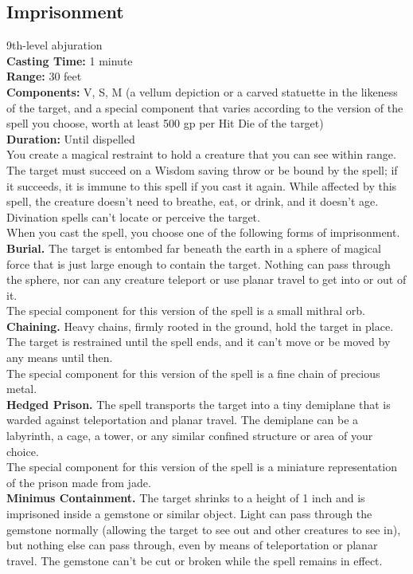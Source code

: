 \documentclass[11pt, A4paper, english]{article}
\begin{document}
		\subsection{Imprisonment}
9th-level abjuration \\
\textbf{Casting Time:} 1 minute \\
\textbf{Range:} 30 feet \\
\textbf{Components:} V, S, M (a vellum depiction or a carved statuette in the likeness of the target, and a special component that varies according to the version of the spell you choose, worth at least 500 gp per Hit Die of the target) \\
\textbf{Duration:} Until dispelled \\
You create a magical restraint to hold a creature that you can see within range. The target must succeed on a Wisdom saving throw or be bound by the spell; if it succeeds, it is immune to this spell if you cast it again. While affected by this spell, the creature doesn't need to breathe, eat, or drink, and it doesn’t age. Divination spells can’t locate or perceive the target. \\
When you cast the spell, you choose one of the following forms of imprisonment. \\
\textbf{Burial.} The target is entombed far beneath the earth in a sphere of magical force that is just large enough to contain the target. Nothing can pass through the sphere, nor can any creature teleport or use planar travel to get into or out of it. \\
The special component for this version of the spell is a small mithral orb. \\
\textbf{Chaining.} Heavy chains, firmly rooted in the ground, hold the target in place. The target is restrained until the spell ends, and it can’t move or be moved by any means until then. \\
The special component for this version of the spell is a fine chain of precious metal. \\
\textbf{Hedged Prison.} The spell transports the target into a tiny demiplane that is warded against teleportation and planar travel. The demiplane can be a labyrinth, a cage, a tower, or any similar confined structure or area of your choice. \\
The special component for this version of the spell is a miniature representation of the prison made from jade. \\
\textbf{Minimus Containment.} The target shrinks to a height of 1 inch and is imprisoned inside a gemstone or similar object. Light can pass through the gemstone normally (allowing the target to see out and other creatures to see in), but nothing else can pass through, even by means of teleportation or planar travel. The gemstone can’t be cut or broken while the spell remains in effect. \\
\end{document}
